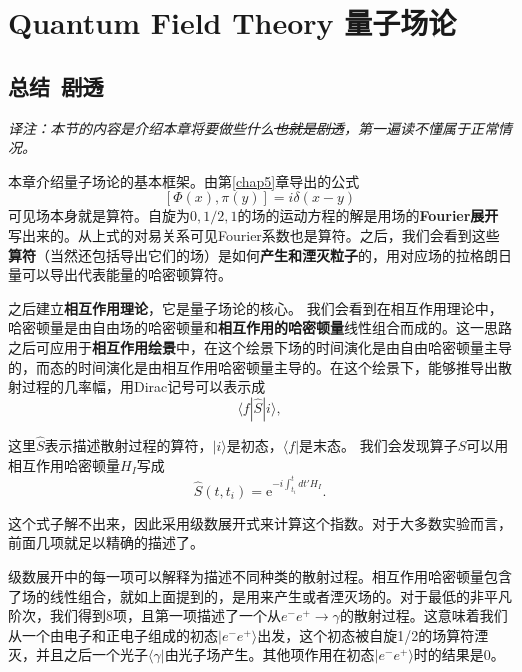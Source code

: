 


\chapter[量子场论]{Quantum Field Theory \quad 量子场论}
\label{chap9}

\section*{总结\, \sout{剧透}}
{\itshape 译注：本节的内容是介绍本章将要做些什么\sout{也就是剧透}，第一遍读不懂属于正常情况。}

本章介绍量子场论的基本框架。由第\ref{chap5}章导出的公式
$$ [\Phi(x), \pi(y)] = i \delta(x - y) $$
可见场本身就是算符。自旋为$0, 1/2, 1$的场的运动方程的解是用场的{\bfseries Fourier展开}写出来的。从上式的对易关系可见Fourier系数也是算符。之后，我们会看到这些{\bfseries 算符}（当然还包括导出它们的场）是如何{\bfseries 产生和湮灭粒子}的，用对应场的拉格朗日量可以导出代表能量的哈密顿算符。

之后建立{\bfseries 相互作用理论}，它是量子场论的核心。 我们会看到在相互作用理论中，哈密顿量是由自由场的哈密顿量和{\bfseries 相互作用的哈密顿量}线性组合而成的。这一思路之后可应用于{\bfseries 相互作用绘景}中，在这个绘景下场的时间演化是由自由哈密顿量主导的，而态的时间演化是由相互作用哈密顿量主导的。在这个绘景下，能够推导出散射过程的几率幅，用Dirac记号可以表示成
$$\langle f | \hat{S} | i\rangle,$$

这里$\hat{S}$表示描述散射过程的算符，$|i\rangle$是初态，$\langle f|$是末态。 我们会发现算子$\hat{S}$可以用相互作用哈密顿量$H_{I}$写成
$$\hat{S}(t,t_{i}) = \mathrm{e}^{-i\int_{t_{i}}^{t} dt' H_{I}}.$$

这个式子解不出来，因此采用级数展开式来计算这个指数。对于大多数实验而言，前面几项就足以精确的描述了。

级数展开中的每一项可以解释为描述不同种类的散射过程。相互作用哈密顿量包含了场的线性组合，就如上面提到的，是用来产生或者湮灭场的。对于最低的非平凡阶次，我们得到8项，且第一项描述了一个从$e^{-} e^{+} \to \gamma$的散射过程。这意味着我们从一个由电子和正电子组成的初态$|e^{-}e^{+} \rangle$出发，这个初态被自旋1/2的场算符湮灭，并且之后一个光子$\langle \gamma |$由光子场产生。其他项作用在初态$|e^{-}e^{+} \rangle$时的结果是0。

